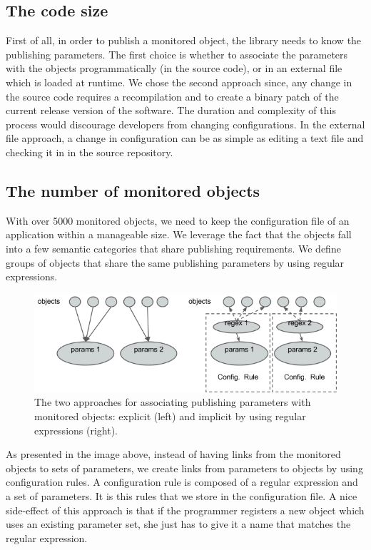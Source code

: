 \subsection*{The code size}

First of all, in order to publish a monitored object, the library needs to know the publishing parameters. The first choice is whether to associate the parameters with the objects programmatically (in the source code), or in an external file which is loaded at runtime. We chose the second approach since, any change in the source code requires a recompilation and to create a binary patch of the current release version of the software. The duration and complexity of this process would discourage developers from changing configurations. In the external file approach, a change in configuration can be as simple as editing a text file and checking it in in the source repository.

\subsection*{The number of monitored objects}

With over 5000 monitored objects, we need to keep the configuration file of an application within a manageable size. We leverage the fact that the objects fall into a few semantic categories that share publishing requirements. We define groups of objects that share the same publishing parameters by using regular expressions. 

\begin{figure}[ht!]
\centering
\includegraphics[scale=0.6]{Images/oks_regex.png}
\caption{The two approaches for associating publishing parameters with monitored objects: explicit (left) and implicit by using regular expressions (right).}
\end{figure}

As presented in the image above, instead of having links from the monitored objects to sets of parameters, we create links from parameters to objects by using configuration rules. A configuration rule is composed of a regular expression and a set of parameters. It is this rules that we store in the configuration file. A nice side-effect of this approach is that if the programmer registers a new object which uses an existing parameter set, she just has to give it a name that matches the regular expression.

